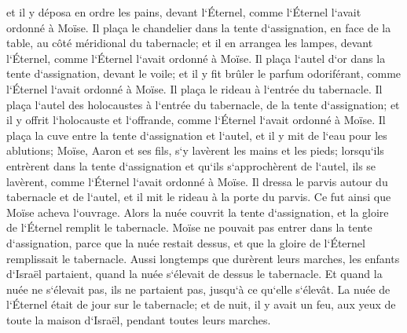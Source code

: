 \verse et il y déposa en ordre les pains, devant l`Éternel, comme l`Éternel l`avait ordonné à Moïse. 
\verse Il plaça le chandelier dans la tente d`assignation, en face de la table, au côté méridional du tabernacle; 
\verse et il en arrangea les lampes, devant l`Éternel, comme l`Éternel l`avait ordonné à Moïse. 
\verse Il plaça l`autel d`or dans la tente d`assignation, devant le voile; 
\verse et il y fit brûler le parfum odoriférant, comme l`Éternel l`avait ordonné à Moïse. 
\verse Il plaça le rideau à l`entrée du tabernacle. 
\verse Il plaça l`autel des holocaustes à l`entrée du tabernacle, de la tente d`assignation; et il y offrit l`holocauste et l`offrande, comme l`Éternel l`avait ordonné à Moïse. 
\verse Il plaça la cuve entre la tente d`assignation et l`autel, et il y mit de l`eau pour les ablutions; 
\verse Moïse, Aaron et ses fils, s`y lavèrent les mains et les pieds; 
\verse lorsqu`ils entrèrent dans la tente d`assignation et qu`ils s`approchèrent de l`autel, ils se lavèrent, comme l`Éternel l`avait ordonné à Moïse. 
\verse Il dressa le parvis autour du tabernacle et de l`autel, et il mit le rideau à la porte du parvis. Ce fut ainsi que Moïse acheva l`ouvrage. 
\verse Alors la nuée couvrit la tente d`assignation, et la gloire de l`Éternel remplit le tabernacle. 
\verse Moïse ne pouvait pas entrer dans la tente d`assignation, parce que la nuée restait dessus, et que la gloire de l`Éternel remplissait le tabernacle. 
\verse Aussi longtemps que durèrent leurs marches, les enfants d`Israël partaient, quand la nuée s`élevait de dessus le tabernacle. 
\verse Et quand la nuée ne s`élevait pas, ils ne partaient pas, jusqu`à ce qu`elle s`élevât. 
\verse La nuée de l`Éternel était de jour sur le tabernacle; et de nuit, il y avait un feu, aux yeux de toute la maison d`Israël, pendant toutes leurs marches. 
